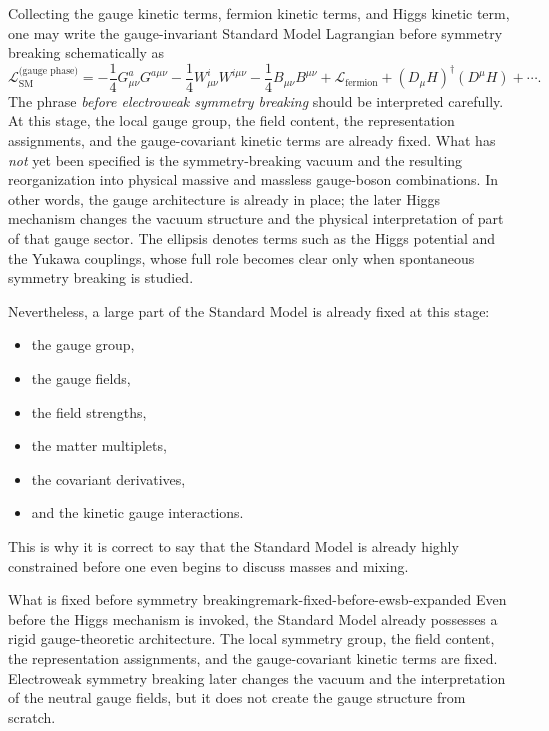 \documentclass[11pt,a4paper]{article}
\newcommand{\Lag}{\mathcal{L}}
\begin{document}
Collecting the gauge kinetic terms, fermion kinetic terms, and Higgs kinetic term, one may write the gauge-invariant Standard Model Lagrangian before symmetry breaking schematically as
\begin{equation}
\Lag_{\text{SM}}^{\text{(gauge phase)}}=
-\frac14 G_{\mu\nu}^aG^{a\mu\nu}
-\frac14 W_{\mu\nu}^iW^{i\mu\nu}
-\frac14 B_{\mu\nu}B^{\mu\nu}
+\Lag_{\text{fermion}}
+(D_\mu H)^\dagger(D^\mu H)
+\cdots.
\label{eq:sm-gauge-phase-expanded}
\end{equation}
The phrase \textit{before electroweak symmetry breaking} should be interpreted carefully. At this stage, the local gauge group, the field content, the representation assignments, and the gauge-covariant kinetic terms are already fixed. What has \emph{not} yet been specified is the symmetry-breaking vacuum and the resulting reorganization into physical massive and massless gauge-boson combinations. In other words, the gauge architecture is already in place; the later Higgs mechanism changes the vacuum structure and the physical interpretation of part of that gauge sector. 
The ellipsis denotes terms such as the Higgs potential and the Yukawa couplings, whose full role becomes clear only when spontaneous symmetry breaking is studied.

Nevertheless, a large part of the Standard Model is already fixed at this stage:
\begin{itemize}[leftmargin=1.7em]
    \item the gauge group,
    \item the gauge fields,
    \item the field strengths,
    \item the matter multiplets,
    \item the covariant derivatives,
    \item and the kinetic gauge interactions.
\end{itemize}
This is why it is correct to say that the Standard Model is already highly constrained before one even begins to discuss masses and mixing.



\begin{remarkbox}{What is fixed before symmetry breaking}{remark-fixed-before-ewsb-expanded}
Even before the Higgs mechanism is invoked, the Standard Model already possesses a rigid gauge-theoretic architecture. The local symmetry group, the field content, the representation assignments, and the gauge-covariant kinetic terms are fixed. Electroweak symmetry breaking later changes the vacuum and the interpretation of the neutral gauge fields, but it does not create the gauge structure from scratch.
\end{remarkbox}
\end{document}
